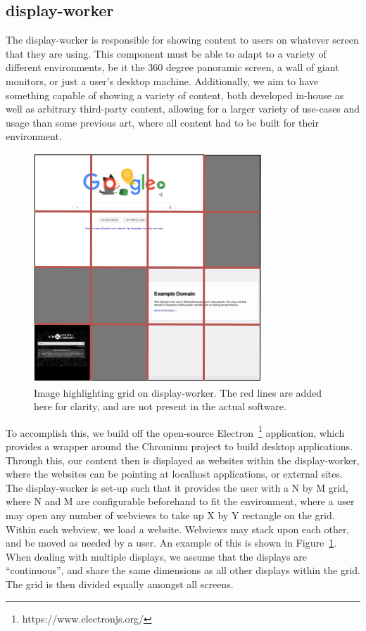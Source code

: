 \subsection{display-worker}\label{sec:display-worker}

The display-worker is responsible for showing content to users on whatever screen
that they are using. This component must be able to adapt to a variety of different
environments, be it the 360 degree panoramic screen, a wall of giant monitors, or 
just a user's desktop machine. Additionally, we aim to have something capable of 
showing a variety of content, both developed in-house as well as arbitrary 
third-party content, allowing for a larger variety of use-cases and usage than
some previous art, where all content had to be built for their environment.

\begin{figure}
    \centering
    \includegraphics[width=0.5\columnwidth]{chapters/02_technology/figures/display_server.png}
    \caption{Image highlighting grid on display-worker. The red lines are added here for clarity, and are not present in the actual software.}
    \label{fig:display_server_grid}
\end{figure}

To accomplish this, we build off the open-source 
Electron~\footnote{https://www.electronjs.org/} application, which provides a
wrapper around the Chromium project to build desktop applications. Through this,
our content then is displayed as websites within the display-worker, where the 
websites can be pointing at localhost applications, or external sites. The 
display-worker is set-up such that it provides the user with a N by M grid, where
N and M are configurable beforehand to fit the environment, where a user may open
any number of webviews to take up X by Y rectangle on the grid. Within each
webview, we load a website. Webviews may stack upon each other, and be moved as 
needed by a user. An example of this is shown in 
Figure~\ref{fig:display_server_grid}. When dealing with multiple displays, we
assume that the displays are ``continuous'', and share the same dimensions as
all other displays within the grid. The grid is then divided equally amongst all 
screens.

